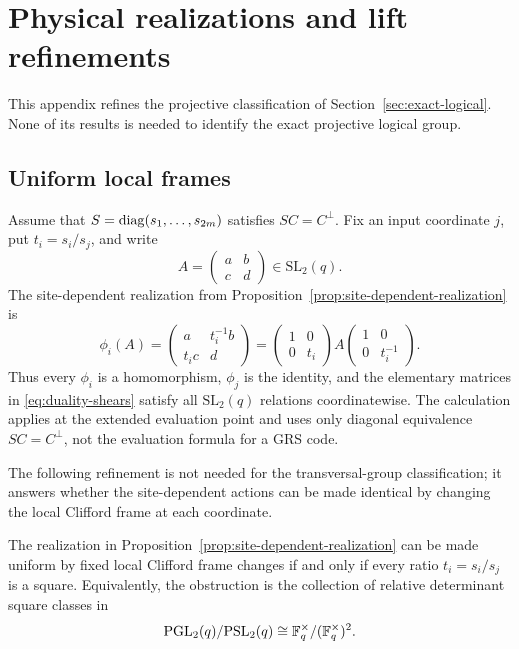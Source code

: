 \section{Physical realizations and lift refinements}
\label{sec:lift-refinements}

This appendix refines the projective classification of
Section~\ref{sec:exact-logical}.  None of its results is needed to identify
the exact projective logical group.

\subsection{Uniform local frames}

Assume that \(S=\operatorname{diag}(s_1,\ldots,s_{2m})\) satisfies
\(SC=C^\perp\).  Fix an input coordinate \(j\), put \(t_i=s_i/s_j\), and
write
\[
 A=\begin{pmatrix}a&b\\c&d\end{pmatrix}\in\mathrm{SL}_2(q).
\]
The site-dependent realization from
Proposition~\ref{prop:site-dependent-realization} is
\[
 \phi_i(A)=
 \begin{pmatrix}a&t_i^{-1}b\\t_i c&d\end{pmatrix}
 =
 \begin{pmatrix}1&0\\0&t_i\end{pmatrix}
 A
 \begin{pmatrix}1&0\\0&t_i^{-1}\end{pmatrix}.
\]
Thus every \(\phi_i\) is a homomorphism, \(\phi_j\) is the identity,
and the elementary matrices in \eqref{eq:duality-shears} satisfy all
\(\mathrm{SL}_2(q)\) relations coordinatewise.  The calculation applies at
the extended evaluation point and uses only diagonal equivalence
\(SC=C^\perp\), not the evaluation formula for a GRS code.

The following refinement is not needed for the transversal-group
classification; it answers whether the site-dependent actions can be made
identical by changing the local Clifford frame at each coordinate.

\begin{proposition}
\label{prop:uniform-local-frames}
The realization in Proposition~\ref{prop:site-dependent-realization} can be
made uniform by fixed local Clifford frame changes if and only if every ratio
\(t_i=s_i/s_j\) is a square.  Equivalently, the obstruction is the collection
of relative determinant square classes in
\[
 \mathrm{PGL}_2(q)/\mathrm{PSL}_2(q)
 \cong\mathbb F_q^\times/(\mathbb F_q^\times)^2.
\]
\end{proposition}

